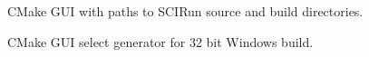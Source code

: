 \documentclass[fleqn,12pt,openany]{book}
\begin{document}
\begin{figure}[H]
\caption{CMake GUI with paths to SCIRun source and build directories.}
\label{fig:cmake-gui-windows1}
\end{figure}

\begin{figure}[H]
\caption{CMake GUI select generator for 32 bit Windows build.}
\label{fig:cmake-gui-windows2}
\end{figure}
\end{document}
